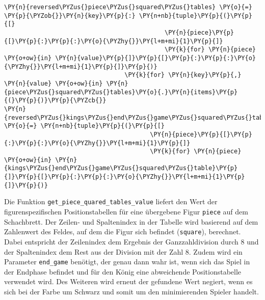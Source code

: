 \bigskip

    \begin{tcolorbox}[fontupper=\linespread{.66}\selectfont, breakable, size=fbox, boxrule=1pt, pad at break*=1mm,colback=cellbackground, colframe=cellborder]
\begin{Verbatim}[commandchars=\\\{\}]
\PY{n}{reversed\PYZus{}piece\PYZus{}squared\PYZus{}tables} \PY{o}{=} \PY{p}{\PYZob{}}\PY{n}{key}\PY{p}{:} \PY{n+nb}{tuple}\PY{p}{(}\PY{p}{[}
                                            \PY{n}{piece}\PY{p}{[}\PY{p}{:}\PY{p}{:}\PY{o}{\PYZhy{}}\PY{l+m+mi}{1}\PY{p}{]}
                                            \PY{k}{for} \PY{n}{piece} \PY{o+ow}{in} \PY{n}{value}\PY{p}{]}\PY{p}{[}\PY{p}{:}\PY{p}{:}\PY{o}{\PYZhy{}}\PY{l+m+mi}{1}\PY{p}{]}\PY{p}{)} 
                                 \PY{k}{for} \PY{n}{key}\PY{p}{,} \PY{n}{value} \PY{o+ow}{in} \PY{n}{piece\PYZus{}squared\PYZus{}tables}\PY{o}{.}\PY{n}{items}\PY{p}{(}\PY{p}{)}\PY{p}{\PYZcb{}}
\PY{n}{reversed\PYZus{}kings\PYZus{}end\PYZus{}game\PYZus{}squared\PYZus{}table} \PY{o}{=} \PY{n+nb}{tuple}\PY{p}{(}\PY{p}{[}
                                        \PY{n}{piece}\PY{p}{[}\PY{p}{:}\PY{p}{:}\PY{o}{\PYZhy{}}\PY{l+m+mi}{1}\PY{p}{]}
                                        \PY{k}{for} \PY{n}{piece} \PY{o+ow}{in} \PY{n}{kings\PYZus{}end\PYZus{}game\PYZus{}squared\PYZus{}table}\PY{p}{]}\PY{p}{[}\PY{p}{:}\PY{p}{:}\PY{o}{\PYZhy{}}\PY{l+m+mi}{1}\PY{p}{]}\PY{p}{)}
\end{Verbatim}
\end{tcolorbox}

    Die Funktion \texttt{get\_piece\_quared\_tables\_value} liefert den Wert
der figurenspezifischen Positionstabellen für eine übergebene Figur
\texttt{piece} auf dem Schachbrett. Der Zeilen- und Spaltenindex in der
Tabelle wird basierend auf dem Zahlenwert des Feldes, auf dem die Figur
sich befindet (\texttt{square}), berechnet. Dabei entspricht der
Zeilenindex dem Ergebnis der Ganzzahldivision durch 8 und der
Spaltenindex dem Rest aus der Division mit der Zahl 8. Zudem wird ein
Parameter \texttt{end\_game} benötigt, der genau dann wahr ist, wenn
sich das Spiel in der Endphase befindet und für den König eine
abweichende Positionstabelle verwendet wird. Des Weiteren wird erneut
der gefundene Wert negiert, wenn es sich bei der Farbe um Schwarz und
somit um den minimierenden Spieler handelt.

\bigskip


